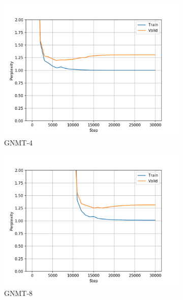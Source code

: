 \begin{figure}[h]
\begin{subfigure}{0.3\textwidth}
\includegraphics[width=\textwidth]{../results/monument2_1/run1/wmt16_gnmt_4_layer/ppls.png} 
\caption{GNMT-4}
\label{fig:monu1 gnmt4 ppl}
\end{subfigure}
\hfill
\begin{subfigure}{0.3\textwidth}
\includegraphics[width=\textwidth]{../results/monument2_1/run1/wmt16_gnmt_8_layer/ppls.png}
\caption{GNMT-8}
\label{fig:monu1 gnmt8 ppl}
\end{subfigure}
\hfill
\begin{subfigure}{0.3\textwidth}

\end{subfigure}
\end{figure}
